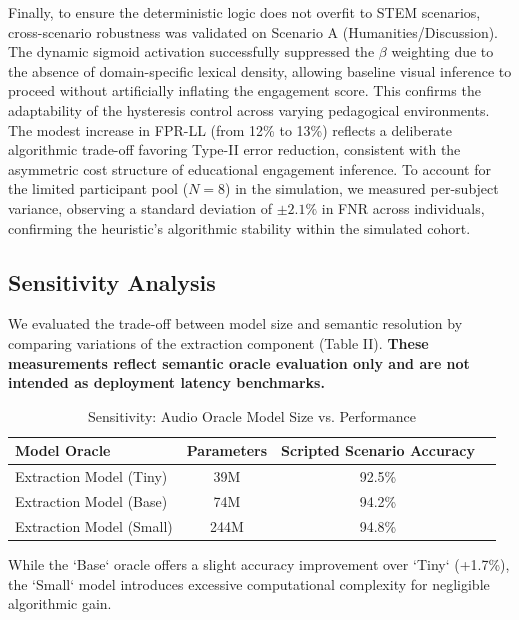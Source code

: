 \documentclass[conference]{IEEEtran}
\begin{document}
Finally, to ensure the deterministic logic does not overfit to STEM scenarios, cross-scenario robustness was validated on Scenario A (Humanities/Discussion). The dynamic sigmoid activation successfully suppressed the $\beta$ weighting due to the absence of domain-specific lexical density, allowing baseline visual inference to proceed without artificially inflating the engagement score. This confirms the adaptability of the hysteresis control across varying pedagogical environments. The modest increase in FPR-LL (from 12\% to 13\%) reflects a deliberate algorithmic trade-off favoring Type-II error reduction, consistent with the asymmetric cost structure of educational engagement inference. To account for the limited participant pool ($N=8$) in the simulation, we measured per-subject variance, observing a standard deviation of $\pm 2.1\%$ in FNR across individuals, confirming the heuristic's algorithmic stability within the simulated cohort.

\subsection{Sensitivity Analysis}
We evaluated the trade-off between model size and semantic resolution by comparing variations of the extraction component (Table II). \textbf{These measurements reflect semantic oracle evaluation only and are not intended as deployment latency benchmarks.}

\begin{table}[htbp]
\caption{Sensitivity: Audio Oracle Model Size vs. Performance}
\begin{center}
\begin{tabular}{lccc}
\toprule
\textbf{Model Oracle} & \textbf{Parameters} & \textbf{Scripted Scenario Accuracy} \\
\midrule
Extraction Model (Tiny) & 39M & 92.5\% \\
Extraction Model (Base) & 74M & 94.2\% \\
Extraction Model (Small) & 244M & 94.8\% \\
\bottomrule
\end{tabular}
\end{center}
\end{table}

While the `Base` oracle offers a slight accuracy improvement over `Tiny` (+1.7\%), the `Small` model introduces excessive computational complexity for negligible algorithmic gain. 
\end{document}
